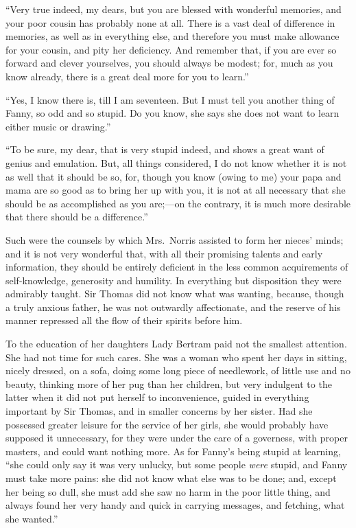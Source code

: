 \documentclass{article}
\begin{document}
``Very true indeed, my dears, but you are blessed with
wonderful memories, and your poor cousin has probably none
at all.  There is a vast deal of difference in memories,
as well as in everything else, and therefore you must
make allowance for your cousin, and pity her deficiency.
And remember that, if you are ever so forward and clever
yourselves, you should always be modest; for, much as you
know already, there is a great deal more for you to learn.''

``Yes, I know there is, till I am seventeen.  But I must
tell you another thing of Fanny, so odd and so stupid.
Do you know, she says she does not want to learn either
music or drawing.''

``To be sure, my dear, that is very stupid indeed,
and shows a great want of genius and emulation.
But, all things considered, I do not know whether it is
not as well that it should be so, for, though you know
(owing to me) your papa and mama are so good as to bring
her up with you, it is not at all necessary that she
should be as accomplished as you are;---on the contrary,
it is much more desirable that there should be a difference.''

Such were the counsels by which Mrs.\ Norris assisted to form
her nieces' minds; and it is not very wonderful that,
with all their promising talents and early information,
they should be entirely deficient in the less common
acquirements of self-knowledge, generosity and humility.
In everything but disposition they were admirably taught.
Sir Thomas did not know what was wanting, because, though a
truly anxious father, he was not outwardly affectionate,
and the reserve of his manner repressed all the flow of their
spirits before him.

To the education of her daughters Lady Bertram paid not
the smallest attention.  She had not time for such cares.
She was a woman who spent her days in sitting, nicely dressed,
on a sofa, doing some long piece of needlework, of little use
and no beauty, thinking more of her pug than her children,
but very indulgent to the latter when it did not put
herself to inconvenience, guided in everything important
by Sir Thomas, and in smaller concerns by her sister.
Had she possessed greater leisure for the service of her girls,
she would probably have supposed it unnecessary, for they
were under the care of a governess, with proper masters,
and could want nothing more.  As for Fanny's being stupid
at learning, ``she could only say it was very unlucky,
but some people \emph{were} stupid, and Fanny must take more pains:
she did not know what else was to be done; and, except her
being so dull, she must add she saw no harm in the poor
little thing, and always found her very handy and quick
in carrying messages, and fetching, what she wanted.''
\end{document}

